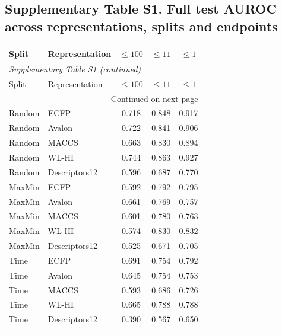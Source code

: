 \subsection*{Supplementary Table S1. Full test AUROC across representations, splits and endpoints}
\begin{longtable}{llccc}

\toprule Split & Representation & $\leq100$ & $\leq11$ & $\leq1$ \\ \midrule\endfirsthead
\multicolumn{5}{l}{\textit{Supplementary Table S1 (continued)}} \\
\toprule Split & Representation & $\leq100$ & $\leq11$ & $\leq1$ \\ \midrule\endhead
\midrule\multicolumn{5}{r}{Continued on next page}\\\endfoot
\bottomrule\endlastfoot
Random & ECFP & 0.718 & 0.848 & 0.917 \\
Random & Avalon & 0.722 & 0.841 & 0.906 \\
Random & MACCS & 0.663 & 0.830 & 0.894 \\
Random & WL-HI & 0.744 & 0.863 & 0.927 \\
Random & Descriptors12 & 0.596 & 0.687 & 0.770 \\
\addlinespace
MaxMin & ECFP & 0.592 & 0.792 & 0.795 \\
MaxMin & Avalon & 0.661 & 0.769 & 0.757 \\
MaxMin & MACCS & 0.601 & 0.780 & 0.763 \\
MaxMin & WL-HI & 0.574 & 0.830 & 0.832 \\
MaxMin & Descriptors12 & 0.525 & 0.671 & 0.705 \\
\addlinespace
Time & ECFP & 0.691 & 0.754 & 0.792 \\
Time & Avalon & 0.645 & 0.754 & 0.753 \\
Time & MACCS & 0.593 & 0.686 & 0.726 \\
Time & WL-HI & 0.665 & 0.788 & 0.788 \\
Time & Descriptors12 & 0.390 & 0.567 & 0.650 \\
\addlinespace
\end{longtable}
